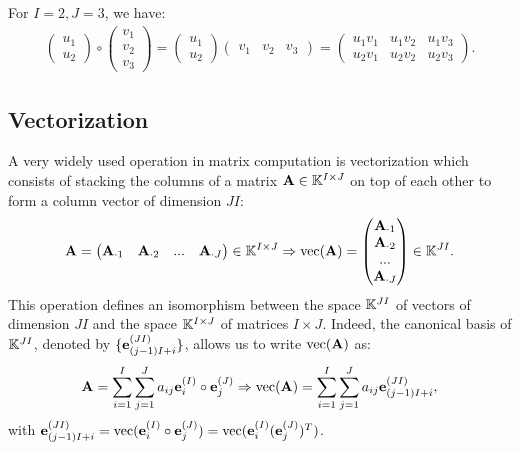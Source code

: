 \begin{example}{}{}
    For $I=2,J=3$, we have:
    \begin{align*}
        \begin{pmatrix}
            u_1\\ u_{2}
        \end{pmatrix}\circ
        \begin{pmatrix}
            v_1\\ v_{2} \\v_{3}
        \end{pmatrix}
        = \begin{pmatrix}
            u_1\\ u_{2}
        \end{pmatrix} 
        \begin{pmatrix}
            v_1& v_{2} &v_{3}
        \end{pmatrix}
        = \begin{pmatrix}
            u_1v_1& u_1v_{2} & u_1v_{3}\\
            u_2v_1& u_2v_2 & u_2v_3
        \end{pmatrix}.
    \end{align*}
\end{example}

\subsection{Vectorization}
A very widely used operation in matrix computation is vectorization
which consists of stacking the columns of a matrix $\bold{A}\in \mathbb{K}^{I\times J}$
on top of each other to form a column vector of dimension $JI$:
\begin{align*}
    \bold{A}=\begin{pmatrix}
        \bold{A}_{\cdot 1}& \bold{A}_{\cdot 2} & ... & \bold{A}_{\cdot J}
    \end{pmatrix}\in \mathbb{K}^{I\times J}
    \Rightarrow \text{vec}(\bold{A}) = \begin{pmatrix}
        \bold{A}_{\cdot 1} \\ \bold{A}_{\cdot 2}\\ ...\\ \bold{A}
        _{\cdot J}
    \end{pmatrix}\in \mathbb{K}^{JI}.
\end{align*}
This operation defines an isomorphism between the space $\mathbb{K}^{JI}$ of vectors
of dimension $JI$ and the space $\mathbb{K}^{I\times J}$ of matrices $I\times J$.
Indeed, the canonical basis of $\mathbb{K}^{JI}$, denoted by $\{\bold{e}_{(j-1)I+i}^{(JI)}\}$, 
allows us to write $\text{vec}(\bold{A})$ as:
\begin{align*}
    \bold{A}=\sum\limits_{i=1}^{I}\sum\limits_{j=1}^{J}a_{ij}\bold{e}_i^{(I)}\circ \bold{e}_j^{(J)}
    \Rightarrow
    \text{vec}(\bold{A})=\sum\limits_{i=1}^{I}\sum\limits_{j=1}^{J}a_{ij}\bold{e}_{(j-1)I+i}^{(JI)},
\end{align*}
with $\bold{e}_{(j-1)I+i}^{(JI)}=\text{vec}(\bold{e}_i^{(I)}\circ \bold{e}_j^{(J)})=\text{vec}(\bold{e}_i^{(I)}(\bold{e}_j^{(J)})^T)$.

